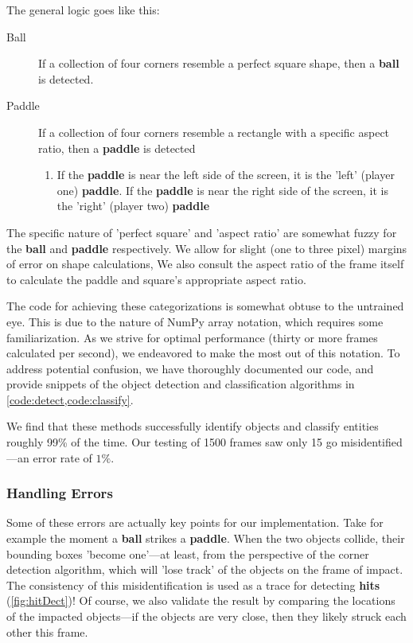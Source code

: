 \documentclass{report}
\newcommand{\state}[1]{\textbf{#1}}
\newcommand{\pad}{\textbf{paddle}\xspace}
\newcommand{\ball}{\textbf{ball}\xspace}
\begin{document}
The general logic goes like this:

\begin{description}
    \item[Ball] If a collection of four corners resemble a perfect square shape, then a \ball is detected.  
    \item[Paddle] If a collection of four corners resemble a rectangle with a specific aspect ratio, then a \pad is detected
        \begin{enumerate}
            \item If the \pad is near the left side of the screen, it is the 'left' (player one) \pad. If the \pad is near the right side of the screen, it is the 'right' (player two) \pad
        \end{enumerate}
\end{description}

The specific nature of 'perfect square' and 'aspect ratio' are somewhat fuzzy for the \ball and \pad respectively. We allow for slight (one to three pixel) margins of error on shape calculations, We also consult the aspect ratio of the frame itself to calculate the paddle and square's appropriate aspect ratio. 


The code for achieving these categorizations is somewhat obtuse to the untrained eye. This is due to the nature of NumPy array notation, which requires some familiarization. As we strive for optimal performance (thirty or more frames calculated per second), we endeavored to make the most out of this notation. To address potential confusion, we have thoroughly documented our code, and provide snippets of the object detection and classification algorithms in \cref{code:detect,code:classify}.


We find that these methods successfully identify objects and classify entities roughly 99\% of the time. Our testing of 1500 frames saw only 15 go misidentified---an error rate of $1\%$. 

\subsubsection{Handling Errors}

Some of these errors are actually key points for our implementation. Take for example the moment a \ball strikes a \pad. When the two objects collide, their bounding boxes 'become one'---at least, from the perspective of the corner detection algorithm, which will 'lose track' of the objects on the frame of impact. The consistency of this misidentification is used as a trace for detecting \state{hits} (\cref{fig:hitDect})!  Of course, we also validate the result by comparing the locations of the impacted objects---if the objects are very close, then they likely struck each other this frame.
\end{document}
